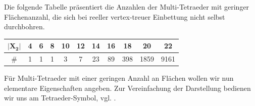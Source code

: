 \documentclass[12pt,titlepage,twoside,cleardoublepage]{article}
\theoremstyle{nummermitklammern}
\numberwithin{equation}{section}
\begin{document}
Die folgende Tabelle präsentiert die Anzahlen der Multi-Tetraeder mit geringer Flächenanzahl, die sich bei reeller vertex-treuer Einbettung nicht selbst durchbohren.  
\begin{center}
\begin{tabular}{|c|c|c|c|c|c|c|c|c|c|c|}
\hline
$\vert\textbf{X}_{\textbf{2}}\vert$&\textbf{4}&\textbf{6}&\textbf{8}&\textbf{10}&\textbf{12}&\textbf{14}&\textbf{16}&\textbf{18}&\textbf{20}&\textbf{22}\\
\hline
$\#$&1&1&1&3&7&23&89&398&1859&9161\\
\hline
\end{tabular}
\end{center} 
Für Multi-Tetraeder mit einer geringen Anzahl an Flächen wollen wir nun elementare Eigenschaften angeben. Zur Vereinfachung der Darstellung bedienen wir uns am Tetraeder-Symbol, vgl. \cite{simp}.
\end{document}
